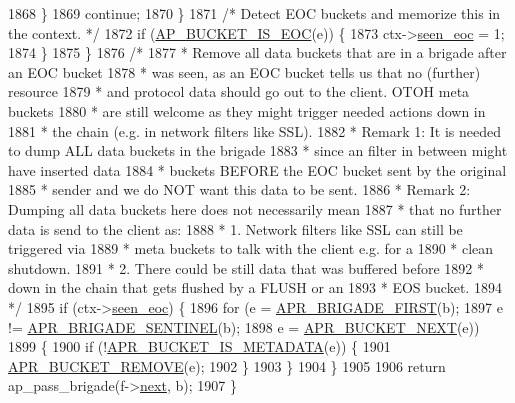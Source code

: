 \begin{DoxyCode}
1868             \}
1869             \textcolor{keywordflow}{continue};
1870         \}
1871         \textcolor{comment}{/* Detect EOC buckets and memorize this in the context. */}
1872         \textcolor{keywordflow}{if} (\hyperlink{group__APACHE__CORE__CONNECTION_ga6ae3ca117a7265de04b91849d6b5acb1}{AP\_BUCKET\_IS\_EOC}(e)) \{
1873             ctx->\hyperlink{structouterror__filter__ctx__t_a8535206a76c9a7e7377d96d1e03f86f6}{seen\_eoc} = 1;
1874         \}
1875     \}
1876     \textcolor{comment}{/*}
1877 \textcolor{comment}{     * Remove all data buckets that are in a brigade after an EOC bucket}
1878 \textcolor{comment}{     * was seen, as an EOC bucket tells us that no (further) resource}
1879 \textcolor{comment}{     * and protocol data should go out to the client. OTOH meta buckets}
1880 \textcolor{comment}{     * are still welcome as they might trigger needed actions down in}
1881 \textcolor{comment}{     * the chain (e.g. in network filters like SSL).}
1882 \textcolor{comment}{     * Remark 1: It is needed to dump ALL data buckets in the brigade}
1883 \textcolor{comment}{     *           since an filter in between might have inserted data}
1884 \textcolor{comment}{     *           buckets BEFORE the EOC bucket sent by the original}
1885 \textcolor{comment}{     *           sender and we do NOT want this data to be sent.}
1886 \textcolor{comment}{     * Remark 2: Dumping all data buckets here does not necessarily mean}
1887 \textcolor{comment}{     *           that no further data is send to the client as:}
1888 \textcolor{comment}{     *           1. Network filters like SSL can still be triggered via}
1889 \textcolor{comment}{     *              meta buckets to talk with the client e.g. for a}
1890 \textcolor{comment}{     *              clean shutdown.}
1891 \textcolor{comment}{     *           2. There could be still data that was buffered before}
1892 \textcolor{comment}{     *              down in the chain that gets flushed by a FLUSH or an}
1893 \textcolor{comment}{     *              EOS bucket.}
1894 \textcolor{comment}{     */}
1895     \textcolor{keywordflow}{if} (ctx->\hyperlink{structouterror__filter__ctx__t_a8535206a76c9a7e7377d96d1e03f86f6}{seen\_eoc}) \{
1896         \textcolor{keywordflow}{for} (e = \hyperlink{group__APR__Util__Bucket__Brigades_gab5826a11eb6ba90786a94282f806c230}{APR\_BRIGADE\_FIRST}(b);
1897              e != \hyperlink{group__APR__Util__Bucket__Brigades_ga858da66dccab1e063415678bb115788a}{APR\_BRIGADE\_SENTINEL}(b);
1898              e = \hyperlink{group__APR__Util__Bucket__Brigades_ga7171f690b203d548a5b6ae0b079068d8}{APR\_BUCKET\_NEXT}(e))
1899         \{
1900             \textcolor{keywordflow}{if} (!\hyperlink{group__APR__Util__Bucket__Brigades_ga506cb29cc1ec1abeb487e01b122bd4d9}{APR\_BUCKET\_IS\_METADATA}(e)) \{
1901                 \hyperlink{group__APR__Util__Bucket__Brigades_ga2c46a1b717a87b68bd98b425e0c64977}{APR\_BUCKET\_REMOVE}(e);
1902             \}
1903         \}
1904     \}
1905 
1906     \textcolor{keywordflow}{return} ap\_pass\_brigade(f->\hyperlink{structap__filter__t_af4835ed2c41734061dc374d92ba401a2}{next},  b);
1907 \}
\end{DoxyCode}
